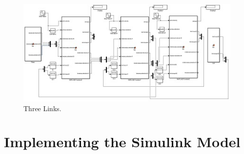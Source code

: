 \begin{figure}[htsb]
  \centering
  \includegraphics{figures/Three Links.jpg}
  \caption{Three Links.}
\end{figure}

\clearpage
\section{Implementing the Simulink Model}


